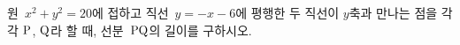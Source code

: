 원~$x^2+y^2=20$에 접하고 직선~$y=-x-6$에 평행한 두 직선이 $y$축과 만나는 점을 각각 $\mathrm{P}$, $\mathrm{Q}$라 할 때, 선분~$\mathrm{PQ}$의 길이를 구하시오.
